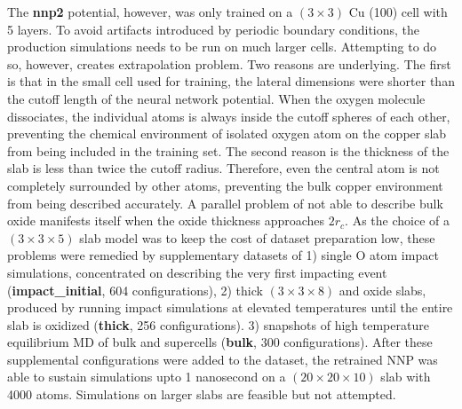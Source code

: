 \documentclass[manuscript=cmatex]{achemso}
\begin{document}
The \textbf{nnp2} potential, however, was only trained on a $(3\times3)$ Cu (100) cell with 5 layers. To avoid artifacts introduced by periodic boundary conditions, the production simulations needs to be run on much larger cells. Attempting to do so, however, creates extrapolation problem. Two reasons are underlying. The first is that in the small cell used for training, the lateral dimensions were shorter than the cutoff length of the neural network potential. When the oxygen molecule dissociates, the individual atoms is always inside the cutoff spheres of each other, preventing the chemical environment of isolated oxygen atom on the copper slab from being included in the training set. The second reason is the thickness of the slab is less than twice the cutoff radius. Therefore, even the central  atom is not completely surrounded by other  atoms, preventing the bulk copper environment from being described accurately. A parallel problem of not able to describe bulk oxide manifests itself when the oxide thickness approaches $2r_c$. As the choice of a $(3\times3\times5)$ slab model was to keep the cost of dataset preparation low, these problems were remedied by supplementary datasets of 1) single O atom impact simulations, concentrated on describing the very first impacting event (\textbf{impact\_initial}, 604 configurations), 2) thick $(3\times3\times8)$  and oxide slabs, produced by running impact simulations at elevated temperatures until the entire slab is oxidized (\textbf{thick}, 256 configurations). 3) snapshots of high temperature equilibrium MD of bulk  and  supercells (\textbf{bulk}, 300 configurations). After these supplemental configurations were added to the dataset, the retrained NNP was able to sustain simulations upto 1 nanosecond on a $(20\times20\times10)$ slab with 4000 atoms. Simulations on larger slabs are feasible but not attempted.
\end{document}
